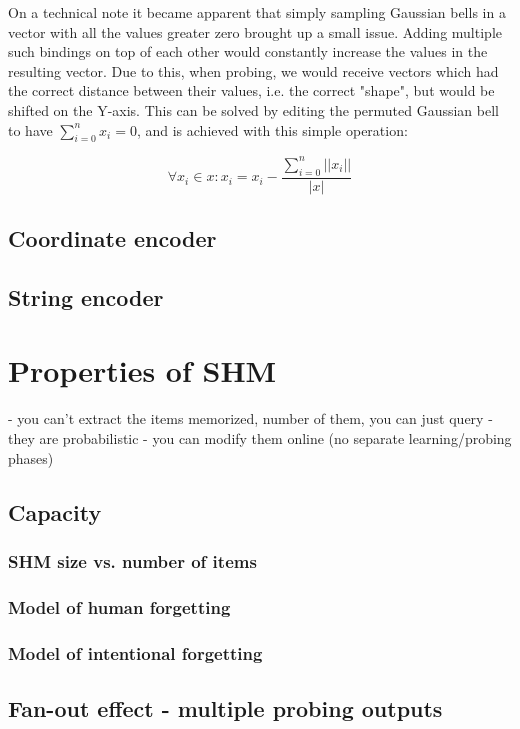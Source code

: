 \documentclass[conference]{IEEEtran}
\begin{document}
On a technical note it became apparent that simply sampling Gaussian bells in a vector with all the values greater zero brought up a small issue. Adding multiple such bindings on top of each other would constantly increase the values in the resulting vector. Due to this, when probing, we would receive vectors which had the correct distance between their values, i.e. the correct "shape", but would be shifted on the Y-axis. This can be solved by editing the permuted Gaussian bell to have \(\sum_{i=0}^n x_i = 0\), and is achieved with this simple operation:

\[ \forall x_i \in x: x_i = x_i - \frac{\sum_{i=0}^n ||x_i||}{|x|} \]

\subsection{Coordinate encoder}

\subsection{String encoder}

\section{Properties of SHM}

- you can't extract the items memorized, number of them, you can just query
- they are probabilistic
- you can modify them online (no separate learning/probing phases)
\subsection{Capacity}
\subsubsection{SHM size vs. number of items}
\subsubsection{Model of human forgetting}
\subsubsection{Model of intentional forgetting}

\subsection{Fan-out effect - multiple probing outputs}
\end{document}
